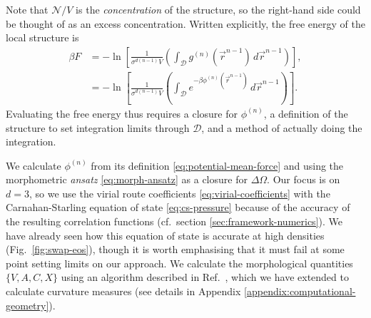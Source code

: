 \documentclass[11pt,twoside]{report}
\begin{document}
Note that $\mathcal{N} / V$ is the \emph{concentration} of the structure, so the right-hand side could be thought of as an excess concentration.
Written explicitly, the free energy of the local structure is
\begin{equation}\label{eq:local-structure-free-energy}
  \begin{split}
    \beta F
    &=
    -\ln{
      \left[
        \frac{1}{\sigma^{d(n-1)} V}
        \left(
        \int_{\mathcal{D}}
        g^{(n)}(\vec{r}^{n-1}) \, d\vec{r}^{n-1}
        \right)
      \right]
    },
    \\
    &=
    -\ln{
      \left[
        \frac{1}{\sigma^{d(n-1)} V}
        \left(
        \int_{\mathcal{D}}
        e^{-\beta\phi^{(n)}(\vec{r}^{n-1})} \, d\vec{r}^{n-1}
        \right)
      \right]
    }.
  \end{split}
\end{equation}
Evaluating the free energy thus requires a closure for $\phi^{(n)}$, a definition of the structure to set integration limits through $\mathcal{D}$, and a method of actually doing the integration.

We calculate $\phi^{(n)}$ from its definition \eqref{eq:potential-mean-force} and using the morphometric \emph{ansatz} \eqref{eq:morph-ansatz} as a closure for $\Delta \Omega$.
Our focus is on $d=3$, so we use the virial route coefficients \eqref{eq:virial-coefficients} with the Carnahan-Starling equation of state \eqref{eq:cs-pressure} because of the accuracy of the resulting correlation functions (cf.\ section \ref{sec:framework-numerics}).
We have already seen how this equation of state is accurate at high densities (Fig.\ \ref{fig:swap-eos}), though it is worth emphasising that it must fail at some point setting limits on our approach.
We calculate the morphological quantities $\{V, A, C, X\}$ using an algorithm described in Ref.\ \cite{KleninJCC2011}, which we have extended to calculate curvature measures (see details in Appendix \ref{appendix:computational-geometry}).
\end{document}
